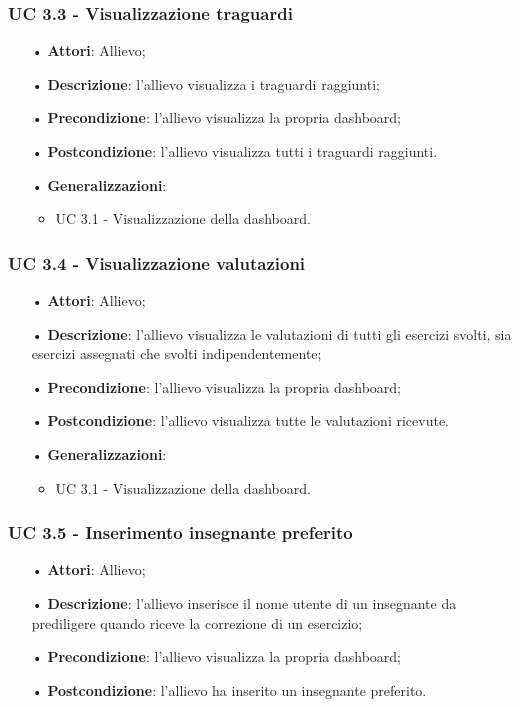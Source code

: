 \subsubsection{UC 3.3 - Visualizzazione traguardi}
\begin{itemize}
\item[•]\textbf{Attori}: Allievo;
\item[•]\textbf{Descrizione}: l'allievo visualizza i traguardi raggiunti;
\item[•]\textbf{Precondizione}: l'allievo visualizza la propria dashboard;
\item[•]\textbf{Postcondizione}: l'allievo visualizza tutti i traguardi raggiunti.
\item[•]\textbf{Generalizzazioni}:
\begin{itemize}
\item UC 3.1 - Visualizzazione della dashboard.
\end{itemize}
\end{itemize}

\subsubsection{UC 3.4 - Visualizzazione valutazioni}
\begin{itemize}
\item[•]\textbf{Attori}: Allievo;
\item[•]\textbf{Descrizione}: l'allievo visualizza le valutazioni di tutti gli esercizi svolti, sia esercizi assegnati che svolti indipendentemente;
\item[•]\textbf{Precondizione}: l'allievo visualizza la propria dashboard;
\item[•]\textbf{Postcondizione}: l'allievo visualizza tutte le valutazioni ricevute.
\item[•]\textbf{Generalizzazioni}:
\begin{itemize}
\item UC 3.1 - Visualizzazione della dashboard.
\end{itemize}
\end{itemize}

\subsubsection{UC 3.5 - Inserimento insegnante preferito}
\begin{itemize}
\item[•]\textbf{Attori}: Allievo;
\item[•]\textbf{Descrizione}: l'allievo inserisce il nome utente di un insegnante da prediligere quando riceve la correzione di un esercizio;
\item[•]\textbf{Precondizione}: l'allievo visualizza la propria dashboard;
\item[•]\textbf{Postcondizione}: l'allievo ha inserito un insegnante preferito.
\end{itemize}


